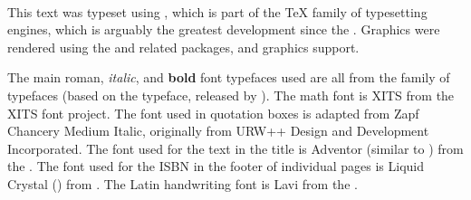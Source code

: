 \vfill\mbox{}
\newpage
\renewcommand{\headrulewidth}{1pt}
\thispagestyle{empty}%
\mbox{}\\\vfill
{}
{\sffamily
This text was typeset using \hi{\XeLaTeX},
which is part of the {\TeX} family of typesetting engines, 
which is arguably the greatest development since the .
Graphics were rendered using the  and related packages, and \hi{\LaTeX} graphics support.

The main {\rmfamily roman}, {\itshape italic}, and {\bfseries bold} font typefaces used 
are all from the  family of typefaces
(based on the  typeface, released by ).
The math font is {{\fntXits XITS}} from the {{\fntXits XITS font project}}.
The font used in quotation boxes is adapted from {\fntZapf Zapf Chancery Medium Italic},
originally from URW++ Design and Development Incorporated.
The font used for the text in the title is {\fntAdventor Adventor} (similar to ) from the .
The font used for the ISBN in the footer of individual pages is 
\mbox{\fntDigital\footnotesize Liquid} \mbox{\fntDigital\footnotesize Crystal} 
() from .
The Latin handwriting font is {\fntLavi Lavi} from the .

}
